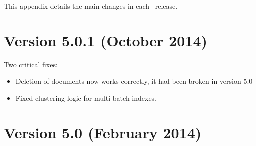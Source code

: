 This appendix details the main changes in each \Mimir\ release.


\section{Version 5.0.1 (October 2014)}
Two critical fixes:
\begin{itemize}
  \item Deletion of documents now works correctly, it had been broken in
  version 5.0
  \item Fixed clustering logic for multi-batch indexes.
\end{itemize}

\section{Version 5.0 (February 2014)}
